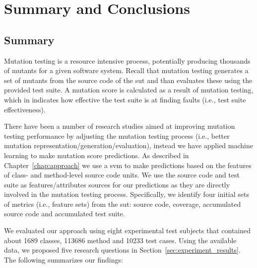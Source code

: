 \chapter{Summary and Conclusions}
\label{chap:conclusions}


\section{Summary}
\label{sec:conclusions_summary}
Mutation testing is a resource intensive process, potentially producing thousands of mutants for a given software system. Recall that mutation testing generates a set of mutants from the source code of the \gls{sut} and than evaluates these using the provided test suite. A mutation score is calculated as a result of mutation testing, which in indicates how effective the test suite is at finding faults (i.e., test suite effectiveness).

There have been a number of research studies aimed at improving mutation testing performance by adjusting the mutation testing process (i.e., better mutation representation/generation/evaluation), instead we have applied machine learning to make mutation score predictions. As described in Chapter~\ref{chap:approach} we use a \gls{svm} to make predictions based on the features of class- and method-level source code units. We use the source code and test suite as features/attributes sources for our predictions as they are directly involved in the mutation testing process. Specifically, we identify four initial sets of metrics (i.e., feature sets) from the \gls{sut}: source code, coverage, accumulated source code and accumulated test suite.

We evaluated our approach using eight experimental test subjects that contained about 1689 classes, 113686 method and 10233 test cases. Using the available data, we proposed five research questions in Section~\ref{sec:experiment_results}. The following summarizes our findings:

